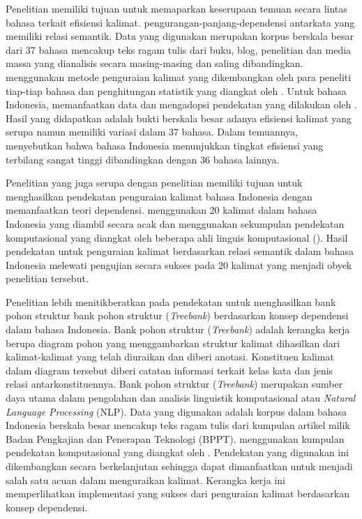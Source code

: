 Penelitian \cite{futrell2015large} memiliki tujuan untuk memaparkan keserupaan temuan secara lintas bahasa terkait efisiensi kalimat. \Gls{pengurangan-panjang-dependensi} antarkata yang memiliki relasi semantik. Data yang digunakan merupakan korpus berskala besar dari 37 bahasa mencakup teks ragam tulis dari buku, blog, penelitian dan media massa yang dianalisis secara masing-masing dan saling dibandingkan. \cite{futrell2015large} menggunakan metode penguraian kalimat yang dikembangkan oleh para peneliti tiap-tiap bahasa dan penghitungan statistik yang diangkat oleh \cite{gelman2007data}. Untuk bahasa Indonesia, \cite{futrell2015large} memanfaatkan data dan mengadopsi pendekatan yang dilakukan oleh \cite{green2012indonesian}. Hasil yang didapatkan adalah bukti berskala besar adanya efisiensi kalimat yang serupa namun memiliki variasi dalam 37 bahasa. Dalam temuannya, \cite{futrell2015large} menyebutkan bahwa bahasa Indonesia menunjukkan tingkat efisiensi yang terbilang sangat tinggi dibandingkan dengan 36 bahasa lainnya. 

Penelitian \cite{green2012indonesian} yang juga serupa dengan penelitian \cite{kamayani2011dependency} memiliki tujuan untuk menghasilkan pendekatan penguraian kalimat bahasa Indonesia dengan memanfaatkan teori dependensi. \cite{kamayani2011dependency} menggunakan 20 kalimat dalam bahasa Indonesia yang diambil secara acak dan menggunakan sekumpulan pendekatan komputasional yang diangkat oleh beberapa ahli linguis komputasional (\citealp{nivre2006dependency, covington2001fundamental, de2008stanford, de2014universal}). Hasil pendekatan untuk penguraian kalimat berdasarkan relasi semantik dalam bahasa Indonesia melewati pengujian secara sukses pada 20 kalimat yang menjadi obyek penelitian tersebut.

Penelitian \cite{green2012indonesian} lebih menitikberatkan pada pendekatan untuk menghasilkan bank pohon struktur bank pohon struktur (\textit{Treebank}) berdasarkan konsep dependensi dalam bahasa Indonesia. Bank pohon struktur (\textit{Treebank}) adalah kerangka kerja berupa diagram pohon yang menggambarkan struktur kalimat dihasilkan dari kalimat-kalimat yang telah diuraikan dan diberi anotasi. Konstituen kalimat dalam diagram tersebut diberi catatan informasi terkait kelas kata dan jenis relasi antarkonstituennya. Bank pohon struktur (\textit{Treebank}) merupakan sumber daya utama dalam pengolahan dan analisis linguistik komputasional atau \textit{Natural Language Processing} (NLP). Data yang digunakan adalah korpus dalam bahasa Indonesia berskala besar mencakup teks ragam tulis dari kumpulan artikel milik Badan Pengkajian dan Penerapan Teknologi (BPPT). \cite{green2012indonesian} menggunakan kumpulan pendekatan komputasional yang diangkat oleh \cite{kubler2009dependency}. Pendekatan yang digunakan \cite{green2012indonesian} ini dikembangkan secara berkelanjutan sehingga dapat dimanfaatkan untuk menjadi salah satu acuan dalam menguraikan kalimat. Kerangka kerja ini memperlihatkan implementasi yang sukses dari penguraian kalimat berdasarkan konsep dependensi.

